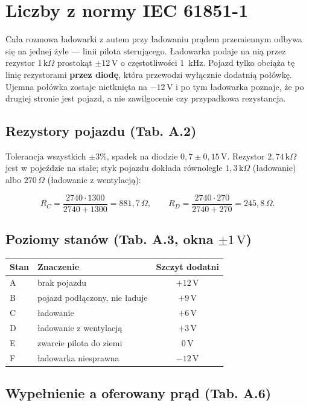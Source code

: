 \documentclass[a4paper,11pt]{article}
\newcommand{\ohm}{\,\Omega}
\newcommand{\kohm}{\,\mathrm{k}\Omega}
\newcommand{\volt}{\,\mathrm{V}}
\begin{document}
\section{Liczby z normy IEC 61851-1}

Cała rozmowa ładowarki z autem przy ładowaniu prądem przemiennym odbywa się na
jednej żyle --- linii pilota sterującego. Ładowarka podaje na nią przez rezystor
$1\kohm$ prostokąt $\pm 12\volt$ o częstotliwości $1$~kHz. Pojazd tylko obciąża tę
linię rezystorami \textbf{przez diodę}, która przewodzi wyłącznie dodatnią połówkę.
Ujemna połówka zostaje nietknięta na $-12\volt$ i po tym ładowarka poznaje, że po
drugiej stronie jest pojazd, a nie zawilgocenie czy przypadkowa rezystancja.

\subsection{Rezystory pojazdu (Tab. A.2)}

Tolerancja wszystkich $\pm 3\%$, spadek na diodzie $0{,}7 \pm 0{,}15\volt$.
Rezystor $2{,}74\kohm$ jest w pojeździe na stałe; styk pojazdu dokłada równolegle
$1{,}3\kohm$ (ładowanie) albo $270\ohm$ (ładowanie z wentylacją):

\[
R_{C}=\frac{2740\cdot 1300}{2740+1300}=881{,}7\ohm,
\qquad
R_{D}=\frac{2740\cdot 270}{2740+270}=245{,}8\ohm .
\]

\subsection{Poziomy stanów (Tab. A.3, okna \texorpdfstring{$\pm 1\volt$}{+/-1 V})}

\begin{center}
\begin{tabular}{llc}
\toprule
Stan & Znaczenie & Szczyt dodatni \\
\midrule
A & brak pojazdu & $+12\volt$ \\
B & pojazd podłączony, nie ładuje & $+9\volt$ \\
C & ładowanie & $+6\volt$ \\
D & ładowanie z wentylacją & $+3\volt$ \\
E & zwarcie pilota do ziemi & $0\volt$ \\
F & ładowarka niesprawna & $-12\volt$ \\
\bottomrule
\end{tabular}
\end{center}

\subsection{Wypełnienie a oferowany prąd (Tab. A.6)}
\end{document}
